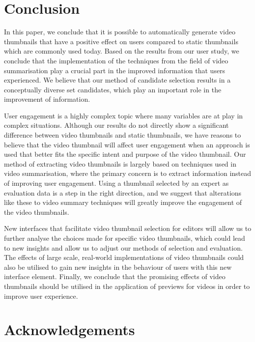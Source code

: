 \documentclass{../resources/sig-alternate-05-2015}
\begin{document}
\section{Conclusion}

In this paper, we conclude that it is possible to automatically generate video thumbnails that have a positive effect on users compared to static thumbnails which are commonly used today. Based on the results from our user study, we conclude that the implementation of the techniques from the field of video summarisation play a crucial part in the improved information that users experienced. We believe that our method of candidate selection results in a conceptually diverse set candidates, which play an important role in the improvement of information.

User engagement is a highly complex topic where many variables are at play in complex situations. Although our results do not directly show a significant difference between video thumbnails and static thumbnails, we have reasons to believe that the video thumbnail will affect user engagement when an approach is used that better fits the specific intent and purpose of the video thumbnail. Our method of extracting video thumbnails is largely based on techniques used in video summarisation, where the primary concern is to extract information instead of improving user engagement. Using a thumbnail selected by an expert as evaluation data is a step in the right direction, and we suggest that alterations like these to video summary techniques will greatly improve the engagement of the video thumbnails.

New interfaces that facilitate video thumbnail selection for editors will allow us to further analyse the choices made for specific video thumbnails, which could lead to new insights and allow us to adjust our methods of selection and evaluation. The effects of large scale, real-world implementations of video thumbnails could also be utilised to gain new insights in the behaviour of users with this new interface element. Finally, we conclude that the promising effects of video thumbnails should be utilised in the application of previews for videos in order to improve user experience.
 
\section{Acknowledgements}
\end{document}
